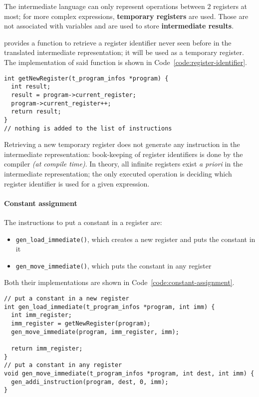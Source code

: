 \documentclass[english]{article}
\begin{document}
The intermediate language can only represent operations between \(2\) registers at most;
for more complex expressions, \textbf{temporary registers} are used.
Those are not associated with variables and are used to store \textbf{intermediate results}.

\acse provides a function to retrieve a register identifier never seen before in the translated intermediate representation;
it will be used as a temporary register.
The implementation of said function is shown in Code~\ref{code:register-identifier}.

\begin{onepage}
  \begin{lstlisting}[language=LANCE, caption={Register identifier}, label={code:register-identifier}]
int getNewRegister(t_program_infos *program) {
  int result;
  result = program->current_register;
  program->current_register++;
  return result;
}
// nothing is added to the list of instructions
\end{lstlisting}
\end{onepage}

Retrieving a new temporary register does not generate any instruction in the intermediate representation:
book-keeping of register identifiers is done by the \acse compiler \textit{(at compile time)}.
In theory, all infinite registers exist \textit{a priori} in the intermediate representation;
the only executed operation is deciding which register identifier is used for a given expression.

\paragraph{Constant assignment}

The instructions to put a constant in a register are:

\begin{itemize}[label=\textbf{\texttt{>}}]
  \item \texttt{gen\_load\_immediate()}, which creates a new register and puts the constant in it
  \item \texttt{gen\_move\_immediate()}, which puts the constant in any register
\end{itemize}

Both their implementations are shown in Code~\ref{code:constant-assignment}.

\begin{onepage}
  \begin{lstlisting}[language=LANCE, caption={Constant assignment}, label={code:constant-assignment}]
// put a constant in a new register
int gen_load_immediate(t_program_infos *program, int imm) {
  int imm_register;
  imm_register = getNewRegister(program);
  gen_move_immediate(program, imm_register, imm);

  return imm_register;
}
// put a constant in any register
void gen_move_immediate(t_program_infos *program, int dest, int imm) {
  gen_addi_instruction(program, dest, 0, imm);
}
\end{lstlisting}
\end{onepage}
\end{document}
